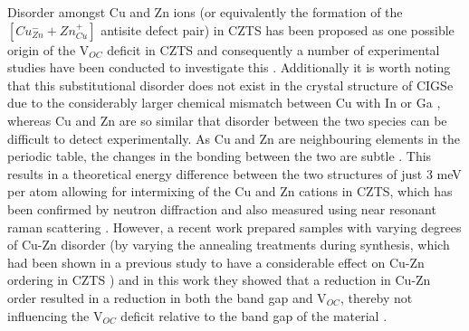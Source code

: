 Disorder amongst Cu and Zn ions (or equivalently the formation of the $[Cu_{Zn}^{-} + Zn_{Cu}^{+}]$ antisite defect pair) in CZTS has been proposed as one possible origin of the V$_{OC}$ deficit in CZTS and consequently a number of experimental studies have been conducted to investigate this \cite{Scragg, pot_fluc_4, neutron, Schorr}. Additionally it is worth noting that this substitutional disorder does not exist in the crystal structure of CIGSe due to the considerably larger chemical mismatch between Cu with In or Ga \cite{culprit}, whereas Cu and Zn are so similar that disorder between the two species can be difficult to detect experimentally. 
As Cu and Zn are neighbouring elements in the periodic table, the changes in the bonding between the two are subtle \cite{pot_fluc}. This results in a theoretical energy difference between the two structures of just 3 meV per atom \cite{Chen2009} allowing for intermixing of the Cu and Zn cations in CZTS, which has been confirmed by neutron diffraction \cite{pot_fluc_4, neutron} and also measured using near resonant raman scattering \cite{Scragg}. However, a recent work prepared samples with varying degrees of Cu-Zn disorder (by varying the annealing treatments during synthesis, which had been shown in a previous study to have a considerable effect on Cu-Zn ordering in CZTS \cite{Scragg}) and in this work they showed that a reduction in Cu-Zn order resulted in a reduction in both the band gap and V$_{OC}$, thereby not influencing the V$_{OC}$ deficit relative to the band gap of the material \cite{culprit}.


